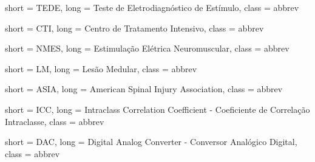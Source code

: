  {
	short = TEDE,
	long = Teste de Eletrodiagnóstico de Estímulo,
	class = abbrev
}

 {
	short = CTI,
	long = Centro de Tratamento Intensivo,
	class = abbrev
}

 {
	short = NMES,
	long =  Estimulação Elétrica Neuromuscular,
	class = abbrev
}

 {
	short = LM,
	long =  Lesão Medular,
	class = abbrev
}

 {
	short = ASIA,
	long =  American Spinal Injury Association,
	class = abbrev
}

 {
	short = ICC,
	long =  Intraclass Correlation Coefficient - Coeficiente de Correlação Intraclasse,
	class = abbrev
}

 {
	short = DAC,
	long =  Digital Analog Converter - Conversor Analógico Digital,
	class = abbrev
}